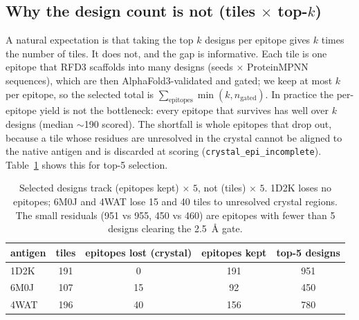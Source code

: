 \subsection{Why the design count is not (tiles $\times$ top-$k$)}
A natural expectation is that taking the top $k$ designs per epitope gives $k$ times the
number of tiles. It does not, and the gap is informative. Each tile is one epitope that RFD3
scaffolds into many designs (seeds $\times$ ProteinMPNN sequences), which are then
AlphaFold3-validated and gated; we keep at most $k$ per epitope, so the selected total is
$\sum_{\text{epitopes}} \min(k, n_{\text{gated}})$. In practice the per-epitope yield is not
the bottleneck: every epitope that survives has well over $k$ designs (median $\sim$190
scored). The shortfall is whole epitopes that drop out, because a tile whose residues are
unresolved in the crystal cannot be aligned to the native antigen and is discarded at scoring
(\texttt{crystal\_epi\_incomplete}). Table~\ref{tab:tilecount} shows this for top-5 selection.

\begin{table}[h]\centering
\begin{tabular}{lcccc}
\toprule
antigen & tiles & epitopes lost (crystal) & epitopes kept & top-5 designs \\
\midrule
1D2K & 191 & 0  & 191 & 951 \\
6M0J & 107 & 15 & 92  & 450 \\
4WAT & 196 & 40 & 156 & 780 \\
\bottomrule
\end{tabular}
\caption{Selected designs track (epitopes kept)$\,\times\,5$, not (tiles)$\,\times\,5$.
1D2K loses no epitopes; 6M0J and 4WAT lose 15 and 40 tiles to unresolved crystal regions.
The small residuals (951 vs 955, 450 vs 460) are epitopes with fewer than 5 designs clearing
the \SI{2.5}{\angstrom} gate.}
\label{tab:tilecount}
\end{table}
